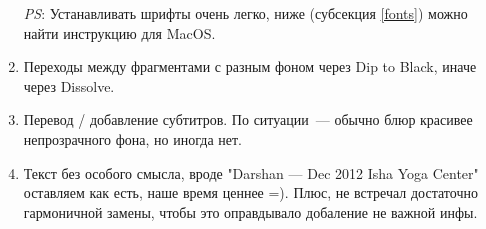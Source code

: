 \documentclass[
a4paper, %
12pt, %
article,
onecolumn, %
openany, %
]{memoir}
\begin{document}
\begin{enumerate}
      \emph{PS}: Устанавливать шрифты очень легко, ниже (субсекция \ref{fonts}) можно
      найти инструкцию для MacOS.


\item Переходы между фрагментами с разным фоном через Dip to Black, иначе через Dissolve.


\item Перевод / добавление субтитров. По ситуации~--- обычно блюр красивее непрозрачного фона, но иногда нет. 

\item Текст без особого смысла, вроде "Darshan — Dec 2012
    Isha Yoga Center" оставляем как есть, наше время ценнее =). 
    {\color{gray}Плюс, не 
   встречал достаточно гармоничной замены, чтобы это оправдывало добаление
   не важной инфы.}
\end{enumerate}
\end{document}
